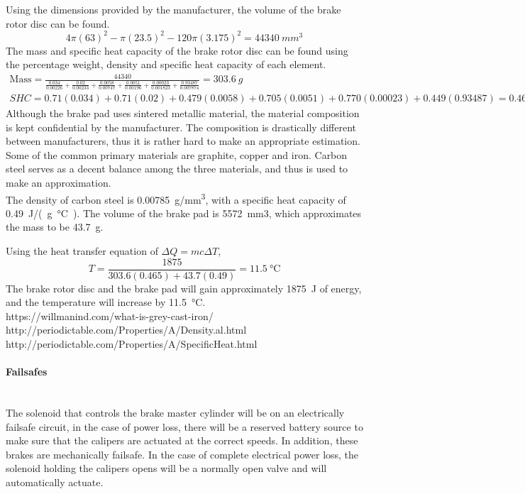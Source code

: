 \documentclass{report}
\let\oldparagraph\paragraph
\renewcommand{\paragraph}[1]{\oldparagraph{#1}\mbox{}\\}
\begin{document}
    Using the dimensions provided by the manufacturer, the volume of the brake rotor disc can be found.
    \[
    4\pi(63)^2-\pi(23.5)^2-120\pi(3.175)^2=\SI{44340}{mm^3}
    \]
    The mass and specific heat capacity of the brake rotor disc can be found using the percentage weight, density and specific heat capacity of each element.
    \begin{gather*}
    \mathrm{Mass} = \frac{44340}{\frac{0.034}{0.00226} + \frac{0.02}{0.00233} + \frac{0.0058}{0.00747} + \frac{0.0051}{0.00196} + \frac{0.00023}{0.001823} + \frac{0.93487}{0.007874}} = \SI{303.6}{g}\\
    \textit{SHC}=0.71(0.034)+0.71(0.02)+0.479(0.0058)+0.705(0.0051)+0.770(0.00023)+0.449(0.93487)=0.465
    \end{gather*}
    Although the brake pad uses sintered metallic material, the material composition is kept confidential by the manufacturer. The composition is drastically different between manufacturers, thus it is rather hard to make an appropriate estimation. Some of the common primary materials are graphite, copper and iron. Carbon steel serves as a decent balance among the three materials, and thus is used to make an approximation.\\
    
    The density of carbon steel is \SI{0.00785}{g/mm^3}, with a specific heat capacity of \SI{0.49}{J/(g\celsius)}. The volume of the brake pad is \SI{5572}{mm3}, which approximates the mass to be \SI{43.7}{g}.
    
    Using the heat transfer equation of $\Delta Q = mc \Delta T$,
    \[
    T=\frac{1875}{303.6(0.465)+43.7(0.49)}=\SI{11.5}{\celsius}
    \]
    The brake rotor disc and the brake pad will gain approximately \SI{1875}{J} of energy, and the temperature will increase by \SI{11.5}{\celsius}.\\
    
    https://willmanind.com/what-is-grey-cast-iron/\\
    http://periodictable.com/Properties/A/Density.al.html\\
    http://periodictable.com/Properties/A/SpecificHeat.html
    
    \paragraph{Failsafes}
    The solenoid that controls the brake master cylinder will be on an electrically failsafe circuit, in the case of power loss, there will be a reserved battery source to make sure that the calipers are actuated at the correct speeds. In addition, these brakes are mechanically failsafe. In the case of complete electrical power loss, the solenoid holding the calipers opens will be a normally open valve and will automatically actuate.
    
\end{document}
